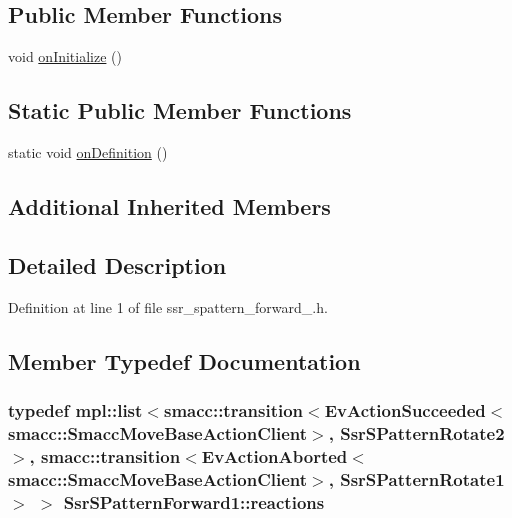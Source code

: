 \subsection*{Public Member Functions}
\begin{DoxyCompactItemize}
\item 
void \hyperlink{structSsrSPatternForward1_a4dcbd54092d60be69442ff7009a9b774}{on\+Initialize} ()
\end{DoxyCompactItemize}
\subsection*{Static Public Member Functions}
\begin{DoxyCompactItemize}
\item 
static void \hyperlink{structSsrSPatternForward1_a2e6358624ff796d27f68636609e2ce3d}{on\+Definition} ()
\end{DoxyCompactItemize}
\subsection*{Additional Inherited Members}


\subsection{Detailed Description}


Definition at line 1 of file ssr\+\_\+spattern\+\_\+forward\+\_.\+h.



\subsection{Member Typedef Documentation}
\subsubsection[{\texorpdfstring{reactions}{reactions}}]{\setlength{\rightskip}{0pt plus 5cm}typedef mpl\+::list$<${\bf smacc\+::transition}$<$Ev\+Action\+Succeeded$<${\bf smacc\+::\+Smacc\+Move\+Base\+Action\+Client}$>$, {\bf Ssr\+S\+Pattern\+Rotate2}$>$, {\bf smacc\+::transition}$<$Ev\+Action\+Aborted$<${\bf smacc\+::\+Smacc\+Move\+Base\+Action\+Client}$>$, {\bf Ssr\+S\+Pattern\+Rotate1}$>$ $>$ {\bf Ssr\+S\+Pattern\+Forward1\+::reactions}}\hypertarget{structSsrSPatternForward1_a1717ab1af0fa7fae0ad608d6eac1b919}{}\label{structSsrSPatternForward1_a1717ab1af0fa7fae0ad608d6eac1b919}


